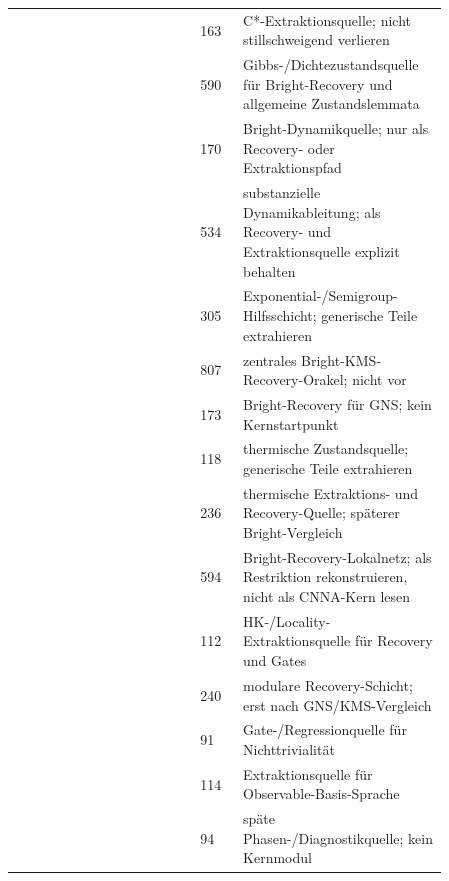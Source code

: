 \documentclass[11pt,a4paper]{article}
\newcommand{\code}[1]{\ifmmode\text{\ttfamily\seqsplit{#1}}\else\begingroup\ttfamily\seqsplit{#1}\endgroup\fi}
\let\oldpath\path
\renewcommand{\path}[1]{\oldpath{#1}}
\begin{document}
\begin{longtable}{L{0.39\linewidth}L{0.09\linewidth}L{0.38\linewidth}}
 & 163 & C*-Extraktionsquelle; nicht stillschweigend verlieren \\
 & 590 & Gibbs-/Dichtezustandsquelle für Bright-Recovery und allgemeine Zustandslemmata \\
 & 170 & Bright-Dynamikquelle; nur als Recovery- oder Extraktionspfad \\
 & 534 & substanzielle Dynamikableitung; als Recovery- und Extraktionsquelle explizit behalten \\
 & 305 & Exponential-/Semigroup-Hilfsschicht; generische Teile extrahieren \\
 & 807 & zentrales Bright-KMS-Recovery-Orakel; nicht vor \code{ComplementKMS} \\
 & 173 & Bright-Recovery für GNS; kein Kernstartpunkt \\
 & 118 & thermische Zustandsquelle; generische Teile extrahieren \\
 & 236 & thermische Extraktions- und Recovery-Quelle; späterer Bright-Vergleich \\
 & 594 & Bright-Recovery-Lokalnetz; als Restriktion rekonstruieren, nicht als CNNA-Kern lesen \\
 & 112 & HK-/Locality-Extraktionsquelle für Recovery und Gates \\
 & 240 & modulare Recovery-Schicht; erst nach GNS/KMS-Vergleich \\
 & 91 & Gate-/Regressionquelle für Nichttrivialität \\
 & 114 & Extraktionsquelle für Observable-Basis-Sprache \\
 & 94 & späte Phasen-/Diagnostikquelle; kein Kernmodul \\

\end{longtable}
\end{document}
